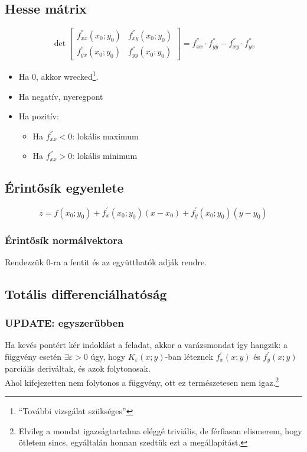 \documentclass[a4paper,12pt]{article}
\begin{document}
\subsection{Hesse mátrix}
\begin{equation}
  \det
\begin{bmatrix}
  f^{''}_{xx}(x_0;y_0) & f^{''}_{xy}(x_0;y_0) \\
  f^{''}_{yx}(x_0;y_0) & f^{''}_{yy}(x_0;y_0)
\end{bmatrix}
= f^{''}_{xx} \cdot f^{''}_{yy} - f^{''}_{xy} \cdot  f^{''}_{yx}
\end{equation}
\begin{itemize}
\item Ha 0, akkor wrecked\footnote{``További vizsgálat szükséges''}.
\item Ha negatív, nyeregpont
\item Ha pozitív:
  \begin{itemize}
  \item Ha $f^{''}_{xx} < 0$: lokális maximum
  \item Ha $f^{''}_{xx} > 0$: lokális minimum
  \end{itemize}
\end{itemize}
\subsection{Érintősík egyenlete}
\begin{equation}
z = f(x_0;y_0) + f^{'}_x(x_0;y_0)(x-x_0) + f^{'}_y(x_0;y_0)(y-y_0)
\end{equation}
\subsubsection{Érintősík normálvektora}
Rendezzük 0-ra a fentit és az együtthatók adják rendre.

\subsection{Totális differenciálhatóság}

\subsubsection{UPDATE: egyszerűbben}
Ha kevés pontért kér indoklást a feladat, akkor a varázsmondat így hangzik: a függvény esetén $\exists \varepsilon > 0$ úgy, hogy $K_{\varepsilon}(x;y)$-ban léteznek $f^ {'}_x(x;y)$ és $f^{'}_y(x;y)$ parciális deriváltak, és azok folytonosak. \\
Ahol kifejezetten nem folytonos a függvény, ott ez természetesen nem igaz.\footnote{Elvileg a mondat igazságtartalma eléggé triviális, de férfiasan elismerem, hogy ötletem sincs, egyáltalán honnan szedtük ezt a megállapítást.}
\end{document}
